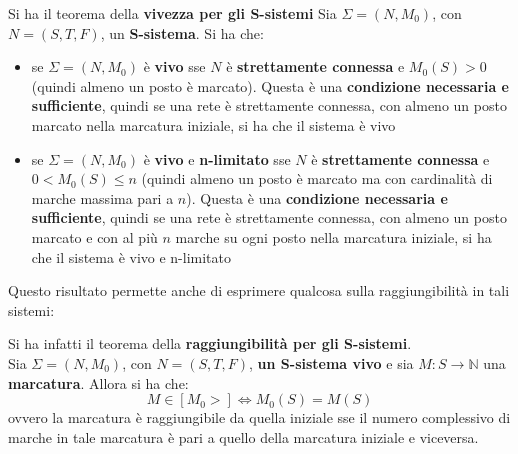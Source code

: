 \documentclass[a4paper,12pt, oneside]{book}
\begin{document}
\begin{teorema}
  Si ha il teorema della \textbf{vivezza per gli S-sistemi} 
  Sia $\Sigma=(N,M_0)$, con $N=(S,T,F)$, un \textbf{S-sistema}. Si ha che:
  \begin{itemize}
    \item se $\Sigma=(N,M_0)$ è \textbf{vivo} sse $N$ è \textbf{strettamente
      connessa} e $M_0(S)>0$ (quindi almeno un posto è marcato). Questa è una
    \textbf{condizione necessaria e sufficiente}, quindi se una rete è
    strettamente connessa, con almeno un posto marcato nella marcatura iniziale,
    si ha che il sistema è vivo
    \item se $\Sigma=(N,M_0)$ è \textbf{vivo} e \textbf{n-limitato} sse $N$ è
    \textbf{strettamente connessa} e $0< M_0(S)\leq n$ (quindi almeno un posto è
    marcato ma con cardinalità di marche massima pari a $n$). Questa è una 
    \textbf{condizione necessaria e sufficiente}, quindi se una rete è
    strettamente connessa, con almeno un posto marcato e con al più $n$ marche
    su ogni posto nella marcatura iniziale, si ha che il sistema è vivo e
    n-limitato 
  \end{itemize}
\end{teorema}
Questo risultato permette anche di esprimere qualcosa sulla raggiungibilità in
tali sistemi:
\begin{teorema}
  Si ha infatti il teorema della \textbf{raggiungibilità per gli S-sistemi}.\\
  Sia $\Sigma=(N,M_0)$, con $N=(S,T,F)$, \textbf{un S-sistema vivo} e sia
  $M:S\to\mathbb{N}$ una \textbf{marcatura}. Allora si ha che:
  \[M\in [M_0>] \Longleftrightarrow M_0(S)=M(S)\]
  ovvero la marcatura è raggiungibile da quella iniziale sse il numero
  complessivo di marche in tale marcatura è pari a quello della marcatura
  iniziale e viceversa. 
\end{teorema}
\end{document}
